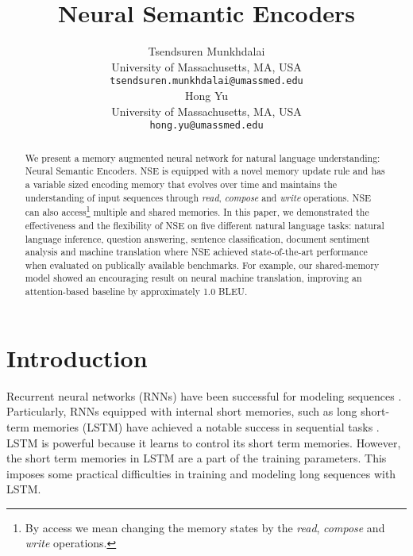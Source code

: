 \documentclass{article}
\title{Neural Semantic Encoders}
\author{
  Tsendsuren Munkhdalai \\
  University of Massachusetts, MA, USA\\
  \texttt{tsendsuren.munkhdalai@umassmed.edu} \\
\And
  Hong Yu \\
  University of Massachusetts, MA, USA \\
   \texttt{hong.yu@umassmed.edu}  \\
}
\begin{document}
\maketitle

\begin{abstract}
We present a memory augmented neural network for natural language understanding: Neural Semantic Encoders. NSE is equipped with a novel memory update rule and has a variable sized encoding memory that evolves over time and maintains the understanding of input sequences  through \textit{read}, \textit{compose} and \textit{write} operations. NSE can also access\footnote{By access we mean changing the memory states by the \textit{read}, \textit{compose} and \textit{write} operations.} multiple and shared memories. 
In this paper, we demonstrated the effectiveness and the flexibility of NSE on five different natural language tasks: natural language inference, question answering, sentence classification, document sentiment analysis and machine translation where NSE achieved state-of-the-art performance when evaluated on publically available benchmarks. For example, our shared-memory model showed an encouraging result on neural machine translation, improving an attention-based baseline by approximately 1.0 BLEU.
\end{abstract}

\section{Introduction}

Recurrent neural networks (RNNs) have been successful for modeling sequences \cite{elman:90}. Particularly, RNNs equipped with internal short memories, such as long short-term memories (LSTM) \cite{hochreiter:97} have achieved a notable success in sequential tasks \cite{cho2014learning,vinyals:15a}. LSTM is powerful because it learns to control its short term memories. However, the short term memories in LSTM are a part of the training parameters. This imposes some practical difficulties in training and modeling long sequences with LSTM.
\end{document}

